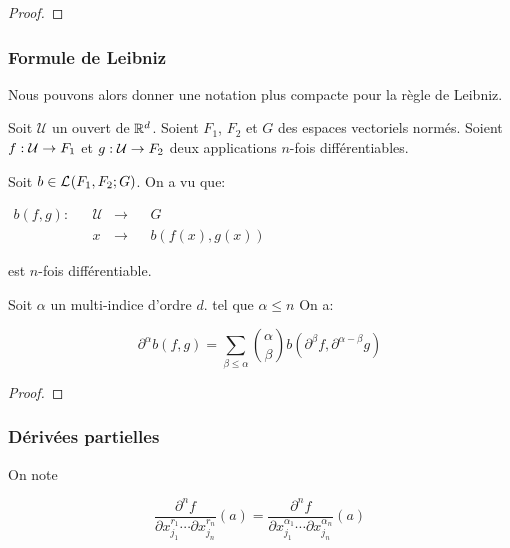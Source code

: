 \ifdefined\outputproof
\begin{proof}

\end{proof}
\fi

\subsubsection{Formule de Leibniz}
Nous pouvons alors donner une notation plus compacte pour la règle de Leibniz.

Soit $\mathcal{U}$ un ouvert de $\mathbb{R}^{d}$.
Soient $F_{1}$, $F_{2}$ et $G$ des espaces vectoriels normés.
Soient $f : \mathcal{U} \rightarrow F_{1}$ et
$g : \mathcal{U} \rightarrow F_{2}$ deux applications $n$-fois différentiables.

Soit $b \in \mathcal{L}_{}(F_{1}, F_{2}; G)$.
On a vu que:

\begin{center}
$
	\begin{aligned}
		b(f, g) : 	& &\mathcal{U} &\rightarrow& 	&G \\
					& &x			&\rightarrow& 	&b(f(x), g(x))
	\end{aligned}
$
\end{center}
est $n$-fois différentiable.

\begin{proposition}
	Soit $\alpha$ un multi-indice d'ordre $d$. tel que $\alpha \leq n$
	On a:

	\begin{equation*}
		\partial^{\alpha} b(f, g) = \displaystyle \sum_{\beta \leq \alpha}
		\binom{\alpha}{\beta} b(\partial^{\beta}f, \partial^{\alpha - \beta}
		g)
	\end{equation*}
\end{proposition}

\ifdefined\outputproof
\begin{proof}

\end{proof}
\fi


\subsubsection{Dérivées partielles}

On note

\begin{equation*}
	\frac{\partial^{n} f}{\partial x_{j_{1}}^{r_{1}} \cdots \partial
	x_{j_{n}}^{r_{n}}} (a) = \frac{\partial^{n} f}{\partial
		x_{j_{1}}^{\alpha_{1}} \cdots \partial x_{j_{n}}^{\alpha_{n}}} (a)
\end{equation*}

